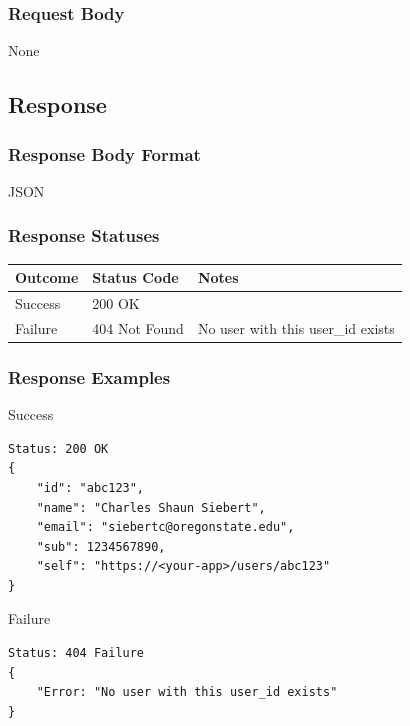 \documentclass[letterpaper,11pt,titlepage,draftclsnofoot,onecolumn,compsoc,utf8,latin1]{IEEEtran}
\begin{document}
\begin{singlespace}
\subsubsection{Request Body}

None

\subsection{Response}
\subsubsection{Response Body Format}

JSON

\subsubsection{Response Statuses}

\begin{center}
\begin{tabular}{ |p{}|p{}|p{}| } 
 \hline
 \textbf{Outcome} & \textbf{Status Code} & \textbf{Notes}  \\  \hline
 Success & 200 OK &  \\ \hline
 Failure & 404 Not Found & No user with this user\_id exists \\ \hline
 \hline
\end{tabular}
\end{center}

\subsubsection{Response Examples}

\noindent \Large{Success}

\begin{lstlisting}[]
Status: 200 OK
{
    "id": "abc123",
    "name": "Charles Shaun Siebert",
    "email": "siebertc@oregonstate.edu",
    "sub": 1234567890,
    "self": "https://<your-app>/users/abc123"
}
\end{lstlisting}

\noindent \Large{Failure}

\begin{lstlisting}[]
Status: 404 Failure
{
    "Error: "No user with this user_id exists"
}
\end{lstlisting}

\newpage 

\normalsize


\end{singlespace}
\end{document}
